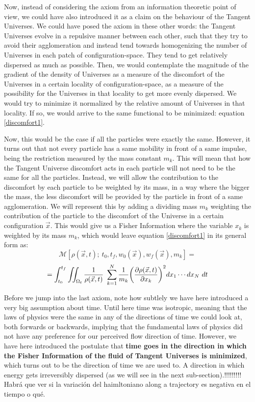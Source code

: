 \documentclass[11pt, a4paper]{article} %
\newcommand{\M}{\mathcal{M}}
\begin{document}
Now, instead of considering the axiom from an information theoretic point of view, we could have also introduced it as a claim on the behaviour of the Tangent Universes. We could have posed the axiom in these other words: the Tangent Universes evolve in a repulsive manner between each other, such that they try to avoid their agglomeration and instead tend towards homogenizing the number of Universes in each patch of configuration-space. They tend to get relatively dispersed as much as possible. Then, we would contemplate the magnitude of the gradient of the density of Universes as a measure of the discomfort of the Universes in a certain locality of configuration-space, as a measure of the possibility for the Universes in that locality to get more evenly dispersed. We would try to minimize it normalized by the relative amount of Universes in that locality. If so, we would arrive to the same functional to be minimized: equation \eqref{discomfort1}.

Now, this would be the case if all the particles were exactly the same. However, it turns out that not every particle has a same mobility in front of a same impulse, being the restriction measured by the mass constant $m_k$. This will mean that how the Tangent Universe discomfort acts in each particle will not need to be the same for all the particles. Instead, we will allow the contribution to the discomfort by each particle to be weighted by its mass, in a way where the bigger the mass, the less discomfort will be provided by the particle in front of a same agglomeration. We will represent this by adding a dividing mass $m_k$ weighting the contribution of the particle to the discomfort of the Universe in a certain configuration $\vec{x}$. This would give us a Fisher Information where the variable $x_k$ is weighted by its mass $m_k$, which would leave equation \eqref{discomfort1} in its general form as:
\begin{equation}\label{discomfort}
\M[\rho(\vec{x},t);\ t_0,t_f,w_0(\vec{x}), w_f(\vec{x}), m_k]=
\end{equation} 
$$
=\int_{t_0}^{t_f} \iint_{\Omega_t} \frac{1}{\rho(\vec{x},t)}\ \sum_{k=1}^N\frac{1}{m_k} \qty(\pdv{\rho(\vec{x},t)}{x_k})^2 dx_1\cdots dx_N\ dt
$$



Before we jump into the last axiom, note how subtlely we have here introduced a very big assumption about time. Until here time was isotropic, meaning that the laws of physics were the same in any of the directions of time we could look at, both forwards or backwards, implying that the fundamental laws of physics did not have any preference for our perceived flow direction of time. However, we have here introduced the postulate that {\bf time goes in the direction in which the Fisher Information of the fluid of Tangent Universes is minimized}, which turns out to be the direction of time we are used to. A direction in which energy gets irreversibly dispersed (as we will see in the next sub-section).!!!!!!!!! Habrá que ver si la variación del haimltoniano along a trajectory es negativa en el tiempo o qué.
\end{document}
